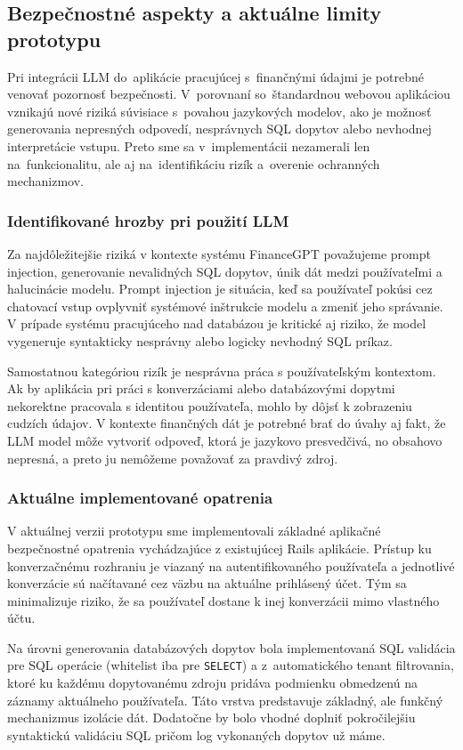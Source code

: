 \subsection{Bezpečnostné aspekty a aktuálne limity prototypu}
Pri integrácii LLM do~aplikácie pracujúcej s~finančnými údajmi je potrebné
venovať pozornosť bezpečnosti. V~porovnaní so~štandardnou webovou aplikáciou vznikajú
nové riziká súvisiace s~povahou jazykových modelov, ako je možnosť generovania
nepresných odpovedí, nesprávnych SQL dopytov alebo nevhodnej interpretácie vstupu.
Preto sme sa v~implementácii nezamerali len na~funkcionalitu, ale aj na~identifikáciu
rizík a~overenie ochranných mechanizmov.

\subsubsection{Identifikované hrozby pri použití LLM}
Za najdôležitejšie riziká v kontexte systému FinanceGPT považujeme prompt injection,
generovanie nevalidných SQL dopytov, únik dát medzi používateľmi a halucinácie modelu.
Prompt injection je situácia, keď sa používateľ pokúsi cez chatovací vstup ovplyvniť
systémové inštrukcie modelu a zmeniť jeho správanie. V prípade systému
pracujúceho nad databázou je kritické aj riziko, že model vygeneruje syntakticky nesprávny
alebo logicky nevhodný SQL príkaz.

Samostatnou kategóriou rizík je nesprávna práca s používateľským kontextom. Ak
by aplikácia pri práci s konverzáciami alebo databázovými dopytmi nekorektne
pracovala s identitou používateľa, mohlo by dôjsť k zobrazeniu cudzích údajov. V
kontexte finančných dát je potrebné brať do úvahy aj fakt, že LLM model môže vytvoriť
odpoveď, ktorá je jazykovo presvedčivá, no obsahovo nepresná, a preto ju
nemôžeme považovať za pravdivý zdroj.

\subsubsection{Aktuálne implementované opatrenia}

V aktuálnej verzii prototypu sme implementovali základné aplikačné bezpečnostné opatrenia
vychádzajúce z existujúcej Rails aplikácie. Prístup ku konverzačnému rozhraniu
je viazaný na autentifikovaného používateľa a jednotlivé konverzácie sú
načítavané cez väzbu na aktuálne prihlásený účet. Tým sa minimalizuje riziko, že
sa používateľ dostane k inej konverzácii mimo vlastného účtu.

Na úrovni generovania databázových dopytov bola implementovaná SQL validácia pre
SQL operácie (whitelist iba pre \texttt{SELECT}) a z~automatického tenant filtrovania,
ktoré ku každému dopytovanému zdroju pridáva podmienku obmedzenú na záznamy
aktuálneho používateľa. Táto vrstva predstavuje základný, ale funkčný
mechanizmus izolácie dát. Dodatočne by bolo vhodné doplniť pokročilejšiu syntaktickú
validáciu SQL pričom log vykonaných dopytov už máme.

